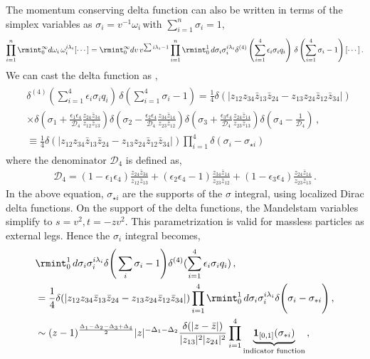 \noindent
The momentum conserving delta function can also be written in terms of the simplex variables \cite{Pasterski:2017ylz} as $\sigma_i=v^{-1}\omega_i  \,\text{with}\,\, \sum_{i=1}^n\sigma_i=1
$,
\begin{align}
  \prod_{i=1}^n\rmint_0^\infty d\omega_i\, \omega_i^{i\lambda_i}[\cdots]=\rmint_0^\infty dv \,v^{\sum i\lambda_i-1}\prod_{i=1}^n\rmint_0^1\,d\sigma_i \sigma_i^{i\lambda_i}\delta^{(4)}\left(\sum_{i=1}^4\epsilon_i\sigma_iq_i\right)\,\delta\left(\sum_{i=1}^4\sigma_{i}-1\right)[\cdots]\,.
\end{align}
We can cast the delta function as \cite{Pasterski:2017ylz},
\begin{align}
\begin{split}\label{5.17u}
&\delta^{(4)}\left(\sum_{i=1}^4\epsilon_i\sigma_iq_i\right)\,\delta\left(\sum_{i=1}^4\sigma_{i}-1\right)
= \frac{1}{4}\delta(|z_{12}z_{34}\bar z_{13}\bar z_{24}-z_{13}z_{24}\bar z_{12}\bar z_{34}|)
\\
&\times\delta\left(\sigma_1+
\frac{\epsilon_1\epsilon_4}{ \mathcal{D}_4 }
	\frac{z_{24}\bar z_{34}}{z_{12}\bar z_{13}}\right)
\delta\left(\sigma_2-
\frac{\epsilon_2\epsilon_4}{ \mathcal{D}_4}
	\frac{z_{34}\bar z_{14}}{z_{23}\bar z_{12}}
\right)\delta\left(\sigma_3+\frac{\epsilon_3\epsilon_4}{ \mathcal{D}_4}
	\frac{z_{24}\bar z_{14}}{z_{23}\bar z_{13}}\right)
	\delta\left(\sigma_4-\frac{1}{\mathcal{D}_4}\right)\,, \\
&\equiv \frac{1}{4}\delta(|z_{12}z_{34}\bar z_{13}\bar z_{24}-z_{13}z_{24}\bar z_{12}\bar z_{34}|)
\prod_{i=1}^4 \delta\left(\sigma_i  - \sigma_{\star i}\right)
\end{split}
\end{align}
where the denominator $\mathcal{D}_4$ is defined as,
\begin{align}
\mathcal{D}_4 = \left( 1-{\epsilon_1\epsilon_4}\right)
	\frac{z_{24} \bar z_{34}}{z_{12}\bar z_{13}}
+\left( {\epsilon_2\epsilon_4}-1\right)
	\frac{z_{34} \bar z_{14}}{z_{23} \bar z_{12}}
+\left(1-{\epsilon_3\epsilon_4}\right)
	\frac{z_{24}\bar z_{14}}{z_{23}\bar z_{13}} \,.
\end{align}
In the above equation, $\sigma_{\star i}$ are the supports of the $\sigma$ integral, using localized Dirac delta functions. 
\noindent
On the support of the delta functions, the Mandelstam variables simplify to $s=v^2, t=-zv^2.$ This parametrization is valid for massless particles as external legs.
Hence the $\sigma_i$ integral becomes,
\begin{align}
\begin{split}
    &\rmint_0^1\,d\sigma_i \sigma_i^{i\lambda_i}\delta{\Bigg(\sum_i\sigma_i-1\Bigg)}\delta^{(4)}(\sum_{i=1}^4\epsilon_i\sigma_iq_i)\,,\\&
    =\frac{1}{4}\delta(|z_{12}z_{34}\bar z_{13}\bar z_{24}-z_{13}z_{24}\bar z_{12}\bar z_{34}|)
\prod_{i=1}^4 \rmint_0^1\,d\sigma_i \sigma_i^{i\lambda_i}\delta\Bigg(\sigma_i  - \sigma_{*i}\Bigg)\,,\\&
\sim (z-1)^{\frac{\Delta_1-\Delta_2-\Delta_3+\Delta_4}{2}}|z|^{-\Delta_1-\Delta_2}\frac{\delta(|z-\bar z|)}{|z_{13}|^2|z_{24}|^2}\prod_{i=1}^4\underbrace{\mathbf{1}_{[0,1]}(\sigma_{*i})}_{\textrm{indicator function}}\,,
\end{split}
\end{align}
